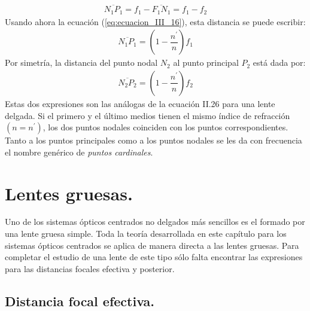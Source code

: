 \documentclass[14pt]{extarticle}
\begin{document}
\begin{align}
\overline{N_{1} P_{1}} = f_{1} - \overline{F_{1} N_{1}} = f_{1} - f_{2}
\label{eq:ecuacion_III_20}
\end{align}
Usando ahora la ecuación (\ref{eq:ecuacion_III_16}), esta distancia se puede escribir:
\begin{align}
\overline{N_{1} P_{1}} = \left( 1 - \dfrac{n^{\prime}}{n} \right) f_{1}
\label{eq:ecuacion_III_21}
\end{align}
Por simetría, la distancia del punto nodal $N_{2}$ al punto principal $P_{2}$ está dada por:
\begin{align}
\overline{N_{2} P_{2}} = \left( 1 - \dfrac{n^{\prime}}{n} \right) f_{2}
\label{eq:ecuacion_III_22}
\end{align}
Estas dos expresiones son las análogas de la ecuación II.26 para una lente delgada.
Si el primero y el último medios tienen el mismo índice de refracción $(n = n^{\prime})$, los dos puntos nodales coinciden con los puntos correspondientes. Tanto a los puntos principales como a los puntos nodales se les da con frecuencia el nombre genérico de \textit{puntos cardinales}.

\section{Lentes gruesas.}

Uno de los sistemas ópticos centrados no delgados más sencillos es el formado por una lente gruesa simple. Toda la teoría desarrollada en este capítulo para los sistemas ópticos centrados se aplica de manera directa a las lentes gruesas. Para completar el estudio de una lente de este tipo sólo falta encontrar las expresiones para las distancias focales efectiva y posterior.

\subsection{Distancia focal efectiva.}
\end{document}
